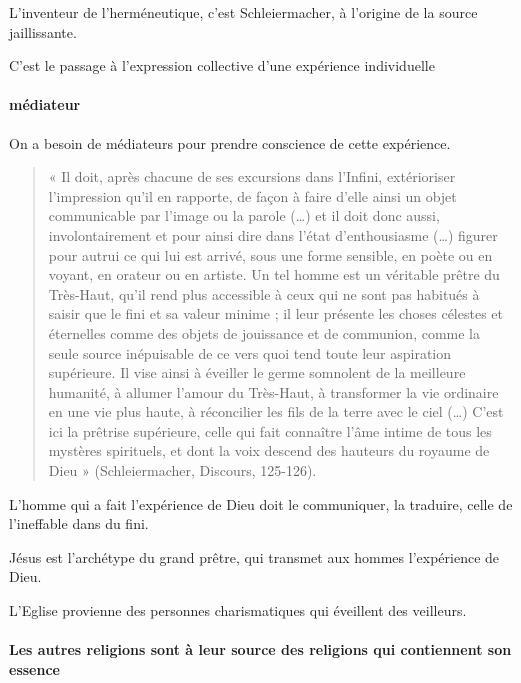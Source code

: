 L'inventeur de l'herméneutique, c'est Schleiermacher, à l'origine de la source jaillissante. 

\begin{Def}[religion]
C'est le passage à l'expression collective d'une expérience individuelle
\end{Def}

\paragraph{médiateur } On a besoin de médiateurs pour prendre conscience de cette expérience.

\begin{quote}
    « Il doit, après chacune de ses excursions dans l’Infini, extérioriser l’impression qu’il en rapporte, de façon à faire d’elle ainsi un objet communicable par l’image ou la parole (…) et il doit donc aussi, involontairement et pour ainsi dire dans l’état d’enthousiasme (…) figurer pour autrui ce qui lui est arrivé, sous une forme sensible, en poète ou en voyant, en orateur ou en artiste. Un tel homme est un véritable prêtre du Très-Haut, qu’il rend plus accessible à ceux qui ne sont pas habitués à saisir que le fini et sa valeur minime ; il leur présente les choses célestes et éternelles comme des objets de jouissance et de communion, comme la seule source inépuisable de ce vers quoi tend toute leur aspiration supérieure. Il vise ainsi à éveiller le germe somnolent de la meilleure humanité, à allumer l’amour du Très-Haut, à transformer la vie ordinaire en une vie plus haute, à réconcilier les fils de la terre avec le ciel (…) C’est ici la prêtrise supérieure, celle qui fait connaître l’âme intime de tous les mystères spirituels, et dont la voix descend des hauteurs du royaume de Dieu » (Schleiermacher, Discours, 125-126).  
\end{quote}
L'homme qui a fait l'expérience de Dieu doit le communiquer, la traduire, celle de l'ineffable dans du fini.

Jésus est l'archétype du grand prêtre, qui transmet aux hommes l'expérience de Dieu.


L'Eglise provienne des personnes charismatiques qui éveillent des veilleurs.

\paragraph{Les autres religions sont à leur source des religions qui contiennent son essence}

